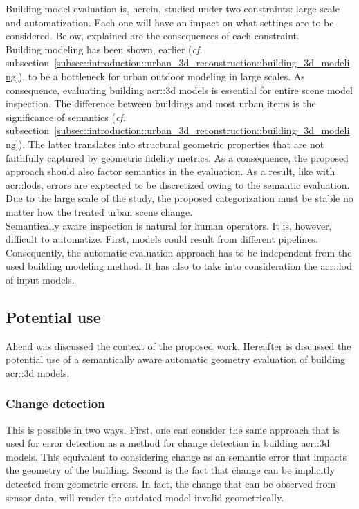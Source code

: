         Building model evaluation is, herein, studied under two constraints: large scale and automatization.
        Each one will have an impact on what settings are to be considered.
        Below, explained are the consequences of each constraint.\\

        Building modeling has been shown, earlier (\textit{cf.} subsection~\ref{subsec::introduction::urban_3d_reconstruction::building_3d_modeling}), to be a bottleneck for urban outdoor modeling in large scales.
        As consequence, evaluating building \gls{acr::3d} models is essential for entire scene model inspection.
        The difference between buildings and most urban items is the significance of semantics (\textit{cf.} subsection~\ref{subsec::introduction::urban_3d_reconstruction::building_3d_modeling}).
        The latter translates into structural geometric properties that are not faithfully captured by geometric fidelity metrics.
        As a consequence, the proposed approach should also factor semantics in the evaluation.
        As a result, like with \glspl{acr::lod}, errors are exptected to be discretized owing to the semantic evaluation.
        Due to the large scale of the study, the proposed categorization must be stable no matter how the treated urban scene change.\\

        Semantically aware inspection is natural for human operators.
        It is, however, difficult to automatize.
        First, models could result from different pipelines.
        Consequently, the automatic evaluation approach has to be independent from the used building modeling method.
        It has also to take into consideration the \gls{acr::lod} of input models.

    \subsection{Potential use}
        \label{subsec::introduction::contributions::use}
        Ahead was discussed the context of the proposed work.
        Hereafter is discussed the potential use of a semantically aware automatic geometry evaluation of building \gls{acr::3d} models.
        \subsubsection{Change detection}
            This is possible in two ways.
            First, one can consider the same approach that is used for error detection as a method for change detection in building \gls{acr::3d} models.
            This equivalent to considering change as an semantic error that impacts the geometry of the building.
            Second is the fact that change can be implicitly detected from geometric errors.
            In fact, the change that can be observed from sensor data, will render the outdated model invalid geometrically.

